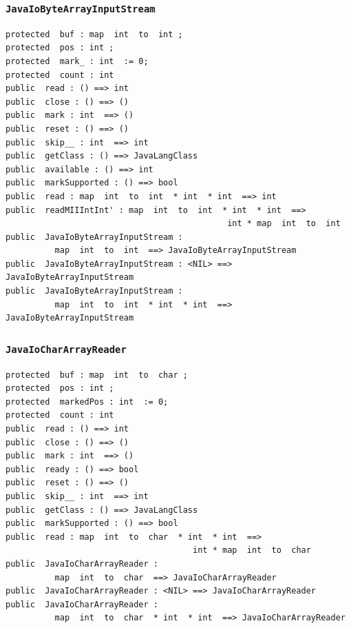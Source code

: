 \documentclass[\pformat,12pt]{article}
\begin{document}
\subsubsection{\texttt{JavaIoByteArrayInputStream}}
\begin{small}
\begin{verbatim}
protected  buf : map  int  to  int ;
protected  pos : int ;
protected  mark_ : int  := 0;
protected  count : int
public  read : () ==> int
public  close : () ==> ()
public  mark : int  ==> ()
public  reset : () ==> ()
public  skip__ : int  ==> int
public  getClass : () ==> JavaLangClass
public  available : () ==> int
public  markSupported : () ==> bool
public  read : map  int  to  int  * int  * int  ==> int
public  readMIIIntInt' : map  int  to  int  * int  * int  ==> 
                                             int * map  int  to  int
public  JavaIoByteArrayInputStream : 
          map  int  to  int  ==> JavaIoByteArrayInputStream
public  JavaIoByteArrayInputStream : <NIL> ==> JavaIoByteArrayInputStream
public  JavaIoByteArrayInputStream : 
          map  int  to  int  * int  * int  ==> JavaIoByteArrayInputStream
\end{verbatim}
\end{small}

\subsubsection{\texttt{JavaIoCharArrayReader}}
\begin{small}
\begin{verbatim}
protected  buf : map  int  to  char ;
protected  pos : int ;
protected  markedPos : int  := 0;
protected  count : int
public  read : () ==> int
public  close : () ==> ()
public  mark : int  ==> ()
public  ready : () ==> bool
public  reset : () ==> ()
public  skip__ : int  ==> int
public  getClass : () ==> JavaLangClass
public  markSupported : () ==> bool
public  read : map  int  to  char  * int  * int  ==> 
                                      int * map  int  to  char
public  JavaIoCharArrayReader : 
          map  int  to  char  ==> JavaIoCharArrayReader
public  JavaIoCharArrayReader : <NIL> ==> JavaIoCharArrayReader
public  JavaIoCharArrayReader : 
          map  int  to  char  * int  * int  ==> JavaIoCharArrayReader
\end{verbatim}
\end{small}
\end{document}
